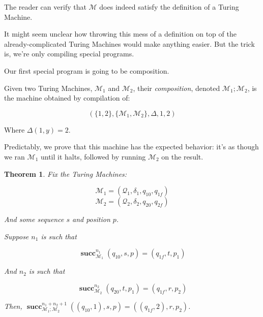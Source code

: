 \documentclass{article}
\newtheorem{theorem}{Theorem}
\newcommand{\M}{\mathcal{M}}
\newcommand{\Q}{\mathcal{Q}}
\DeclareMathOperator{\suc}{\mathbf{succ}}
\begin{document}
	The reader can verify that $\M$ does indeed satisfy the definition of a Turing Machine.
	
	It might seem unclear how throwing this mess of a definition on top of the already-complicated Turing Machines would make anything easier. But the trick is, we're only compiling special programs.
	
	Our first special program is going to be composition.
	
	Given two Turing Machines, $\M_1$ and $\M_2$, their \emph{composition}, denoted $\M_1;\M_2$, is the machine obtained by compilation of:
	
	\[(\{1,2\}, \{\M_1, \M_2\}, \Delta, 1, 2)\]
	
	Where $\Delta(1, y) = 2$.
	
	Predictably, we prove that this machine has the expected behavior: it's as though we ran $\M_1$ until it halts, followed by running $\M_2$ on the result.
	
	\begin{theorem}
	Fix the Turing Machines:
	
	\[\M_1 = (\Q_1, \delta_1, q_{10}, q_{1f})\]
	\[\M_2 = (\Q_2, \delta_2, q_{20}, q_{2f})\]
	
	And some sequence $s$ and position $p$.
	
	Suppose $n_1$ is such that
	
	\[\suc^{n_1}_{\M_1} (q_{10}, s, p) = (q_{1f}, t, p_1)\]
	
	And $n_2$ is such that
	
	\[\suc^{n_2}_{\M_2} (q_{20}, t, p_1) = (q_{1f}, r, p_2)\]
	
	Then, $\suc^{n_1 + n_2 + 1}_{\M_1;\M_2} ((q_{10},1), s, p) = ((q_{1f},2), r, p_2)$.
	\end{theorem}
	
\end{document}
